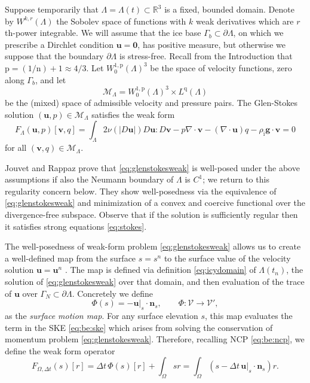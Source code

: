\documentclass[hidelinks,onefignum,onetabnum,final]{siamart220329}  %
\newcommand{\RR}{\mathbb{R}}
\newcommand{\Div}{\nabla\cdot}
\newcommand{\bg}{\mathbf{g}}
\newcommand{\bn}{\mathbf{n}}
\newcommand{\bu}{\mathbf{u}}
\newcommand{\bv}{\mathbf{v}}
\newcommand{\bzero}{\bm{0}}
\newcommand{\cV}{\mathcal{V}}
\newcommand{\nn}{{\text{n}}}
\newcommand{\pp}{{\text{p}}}
\newcommand{\qq}{{\text{q}}}
\newcommand{\rhoi}{\rho_{\text{i}}}
\begin{document}
Suppose temporarily that $\Lambda = \Lambda(t) \subset \RR^3$ is a fixed, bounded domain.  Denote by $W^{k,r}(\Lambda)$ the Sobolev space \cite{Evans2010} of functions with $k$ weak derivatives which are $r$th-power integrable.  We will assume that the ice base $\Gamma_b\subset\partial \Lambda$, on which we prescribe a Dirchlet condition $\bu=\bzero$, has positive measure, but otherwise we suppose that the boundary $\partial \Lambda$ is stress-free.  Recall from the Introduction that $\pp=(1/\nn)+1\approx 4/3$.  Let $W_0^{1,\pp}(\Lambda)^{3}$ be the space of velocity functions, zero along $\Gamma_b$, and let
\begin{equation}
\mathcal{M}_\Lambda = W_0^{1,\pp}(\Lambda)^3 \times L^\qq(\Lambda)  \label{eq:mixed}
\end{equation}
be the (mixed) space of admissible velocity and pressure pairs.  The Glen-Stokes solution $(\bu,p) \in \mathcal{M}_\Lambda$ satisfies the weak form
\begin{equation}
F_\Lambda(\bu,p)[\bv,q] = \int_\Lambda 2 \nu(|D\bu|) D\bu : D\bv - p \Div\bv - (\Div\bu) q - \rhoi \bg \cdot \bv = 0 \label{eq:glenstokesweak}
\end{equation}
for all $(\bv,q) \in \mathcal{M}_\Lambda$.

Jouvet and Rappaz \cite{JouvetRappaz2011} prove that \eqref{eq:glenstokesweak} is well-posed under the above assumptions if also the Neumann boundary of $\Lambda$ is $C^1$; we return to this regularity concern below.  They show well-posedness via the equivalence of \eqref{eq:glenstokesweak} and minimization of a convex and coercive functional over the divergence-free subspace.  Observe that if the solution is sufficiently regular then it satisfies strong equations \eqref{eq:stokes}.

The well-posedness of weak-form problem \eqref{eq:glenstokesweak} allows us to create a well-defined map from the surface $s=s^n$ to the surface value of the velocity solution $\bu=\bu^n$ .  The map is defined via definition \eqref{eq:icydomain} of $\Lambda(t_n)$, the solution of \eqref{eq:glenstokesweak} over that domain, and then evaluation of the trace of $\bu$ over $\Gamma_N\subset \partial\Lambda$.  Concretely we define
\begin{equation}
\Phi(s) = - \bu|_s\cdot \bn_s, \qquad \Phi:\cV \to \cV', \label{eq:be:Phidefine}
\end{equation}
as the \emph{surface motion map}.  For any surface elevation $s$, this map evaluates the term in the SKE \eqref{eq:be:ske} which arises from solving the conservation of momentum problem \eqref{eq:glenstokesweak}.  Therefore, recalling NCP \eqref{eq:be:ncp}, we define the weak form operator
\begin{equation}
F_{\Omega,\Delta t}(s)[r] = \Delta t\,\Phi(s)[r] + \int_\Omega s r = \int_\Omega \left(s - \Delta t\, \bu|_s \cdot \bn_s\right) r.  \label{eq:be:Fdefine}
\end{equation}
\end{document}
